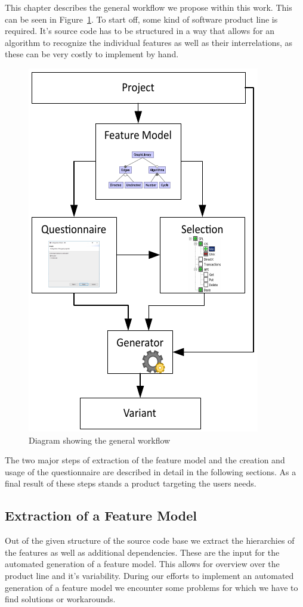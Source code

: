 This chapter describes the general workflow we propose within this work. This can be seen in Figure~\ref{img-workflow}. To start off, some kind of software product line is required. It's source code has to be structured in a way that allows for an algorithm to recognize the individual features as well as their interrelations, as these can be very costly to implement by hand.

\begin{figure}[H]
	\includegraphics{img/img-workflow.pdf}
	\caption{Diagram showing the general workflow}
	\label{img-workflow}
\end{figure}

The two major steps of extraction of the feature model and the creation and usage of the questionnaire are described in detail in the following sections. As a final result of these steps stands a product targeting the users needs.


\subsection{Extraction of a Feature Model}
Out of the given structure of the source code base we extract the hierarchies of the features as well as additional dependencies. These are the input for the automated generation of a feature model. This allows for overview over the product line and it's variability. During our efforts to implement an automated generation of a feature model we encounter some problems for which we have to find solutions or workarounds.

